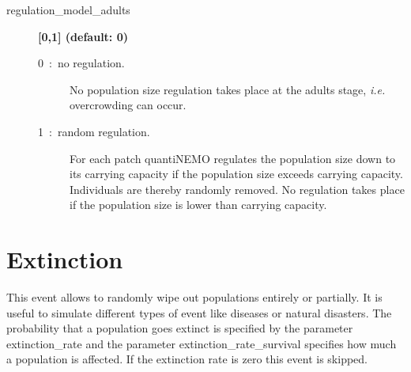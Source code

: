 \documentclass[letterpaper,12pt,oneside]{book}
\begin{document}
\begin{description}
\item[regulation\_model\_adults] \textbf{[0,1] (default: 0)}
\begin{description}
\item[0~:~no regulation.] No population size regulation takes place at the adults stage, \textit{i.e.} overcrowding can occur.
\item[1~:~random regulation.] For each patch quantiNEMO regulates the population size down to its carrying capacity if the population size exceeds carrying capacity. Individuals are thereby randomly removed. No regulation takes place if the population size is lower than carrying capacity.
\end{description}
\end{description}

\section{Extinction}\label{8extinction}
This event allows to randomly wipe out populations entirely or partially. It is useful to simulate different types of event like diseases or natural disasters.   The probability that a population goes extinct is specified by the parameter \textsf{extinction\_rate} and the parameter \textsf{extinction\_rate\_survival} specifies how much a population is affected. If the extinction rate is zero this event is skipped.
\end{document}
